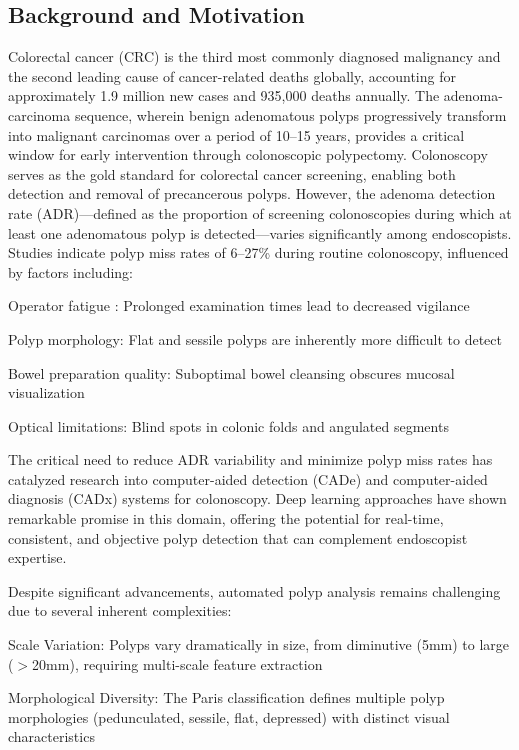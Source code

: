 \documentclass[runningheads]{llncs}
\begin{document}
\subsection{Background and Motivation}

Colorectal cancer (CRC) is the third most commonly diagnosed malignancy and the second leading cause of cancer-related deaths globally, accounting for approximately 1.9 million new cases and 935,000 deaths annually. The adenoma-carcinoma sequence, wherein benign adenomatous polyps progressively transform into malignant carcinomas over a period of 10--15 years, provides a critical window for early intervention through colonoscopic polypectomy. Colonoscopy serves as the gold standard for colorectal cancer screening, enabling both detection and removal of precancerous polyps. However, the adenoma detection rate (ADR)---defined as the proportion of screening colonoscopies during which at least one adenomatous polyp is detected---varies significantly among endoscopists. Studies indicate polyp miss rates of 6--27\% during routine colonoscopy, influenced by factors including:

\noindent Operator fatigue : Prolonged examination times lead to decreased vigilance

\noindent Polyp morphology: Flat and sessile polyps are inherently more difficult to detect

\noindent Bowel preparation quality: Suboptimal bowel cleansing obscures mucosal visualization

\noindent Optical limitations: Blind spots in colonic folds and angulated segments

The critical need to reduce ADR variability and minimize polyp miss rates has catalyzed research into computer-aided detection (CADe) and computer-aided diagnosis (CADx) systems for colonoscopy. Deep learning approaches have shown remarkable promise in this domain, offering the potential for real-time, consistent, and objective polyp detection that can complement endoscopist expertise.

Despite significant advancements, automated polyp analysis remains challenging due to several inherent complexities:

\noindent Scale Variation: Polyps vary dramatically in size, from diminutive (5mm) to large ($>$20mm), requiring multi-scale feature extraction

\noindent Morphological Diversity: The Paris classification defines multiple polyp morphologies (pedunculated, sessile, flat, depressed) with distinct visual characteristics
\end{document}
